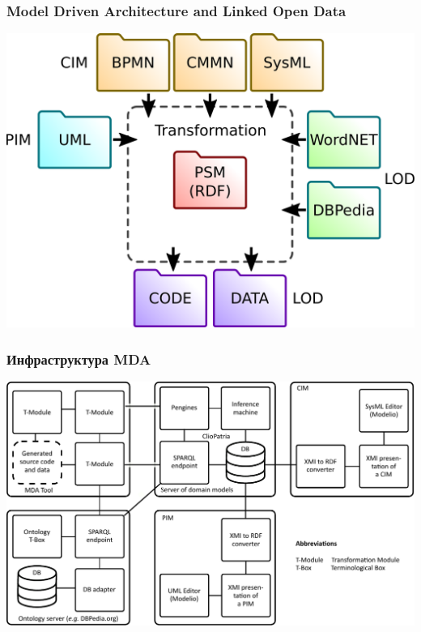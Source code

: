 \documentclass[10pt]{beamer}
\begin{document}
\begin{frame}
  \frametitle{Model Driven Architecture and Linked Open Data}
  \begin{center}
    \includegraphics[width=0.9\linewidth]{mda-overview.pdf}
  \end{center}
\end{frame}

\begin{frame}
  \frametitle{Инфраструктура MDA}
  \centering
  \includegraphics[width=1\linewidth]{architecture-mda-lod-ext.pdf}
\end{frame}
\end{document}
